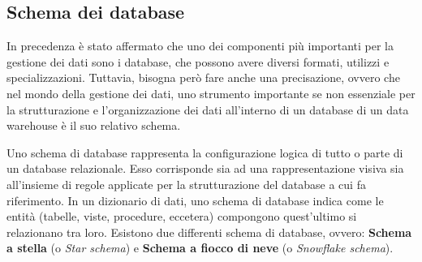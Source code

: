 \subsection{Schema dei database}

In precedenza è stato affermato che uno dei componenti più importanti per la gestione dei dati sono i database, che possono avere diversi formati, utilizzi e specializzazioni. Tuttavia, bisogna però fare anche una precisazione, ovvero che nel mondo della gestione dei dati, uno strumento importante se non essenziale per la strutturazione e l’organizzazione dei dati all’interno di un database di un data warehouse è il suo relativo schema.

Uno schema di database rappresenta la configurazione logica di tutto o parte di un database relazionale. Esso corrisponde sia ad una rappresentazione visiva sia all’insieme di regole applicate per la strutturazione del database a cui fa riferimento. In un dizionario di dati, uno schema di database indica come le entità (tabelle, viste, procedure, eccetera) compongono quest’ultimo si relazionano tra loro.  Esistono due differenti schema di database, ovvero: \textbf{Schema a stella} (o \textit{Star schema}) e \textbf{Schema a fiocco di neve} (o \textit{Snowflake schema}).\cite{researchgate_database_schemas}

